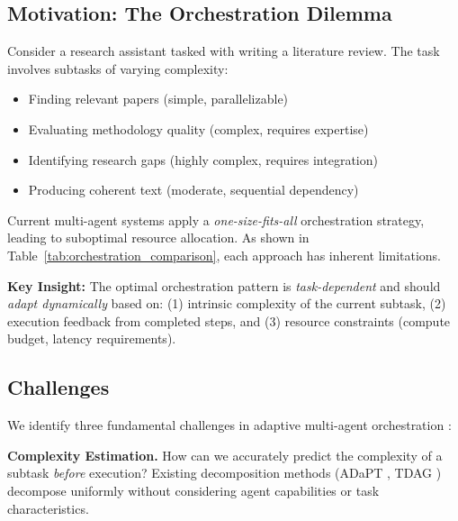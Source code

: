 \documentclass{article}
\theoremstyle{plain}
\theoremstyle{definition}
\theoremstyle{remark}
\begin{document}
\subsection{Motivation: The Orchestration Dilemma}
\label{sec:motivation}

Consider a research assistant tasked with writing a literature review. The task involves subtasks of varying complexity:
\begin{itemize}[nosep,leftmargin=*]
\item Finding relevant papers (simple, parallelizable)
\item Evaluating methodology quality (complex, requires expertise)
\item Identifying research gaps (highly complex, requires integration)
\item Producing coherent text (moderate, sequential dependency)
\end{itemize}

Current multi-agent systems apply a \emph{one-size-fits-all} orchestration strategy, leading to suboptimal resource allocation. As shown in Table~\ref{tab:orchestration_comparison}, each approach has inherent limitations.

\textbf{Key Insight:} The optimal orchestration pattern is \emph{task-dependent} and should \emph{adapt dynamically} based on: (1) intrinsic complexity of the current subtask, (2) execution feedback from completed steps, and (3) resource constraints (compute budget, latency requirements).

\subsection{Challenges}
\label{sec:challenges}

We identify three fundamental challenges in adaptive multi-agent orchestration \citep{toshpulatov2021generative}:

\textbf{Complexity Estimation.} How can we accurately predict the complexity of a subtask \textit{before} execution? Existing decomposition methods (ADaPT \citep{prasad2024adapt}, TDAG \citep{zhang2025tdag}) decompose uniformly without considering agent capabilities or task characteristics.
\end{document}
